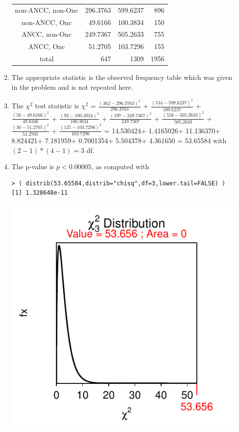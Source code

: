 \documentclass[10pt,openany]{book}\usepackage[]{graphicx}\usepackage[]{color}
\makeatletter
\newenvironment{kframe}{%
 \def\at@end@of@kframe{}%
 \ifinner\ifhmode%
  \def\at@end@of@kframe{\end{minipage}}%
  \begin{minipage}{\columnwidth}%
 \fi\fi%
 \def\FrameCommand##1{\hskip\@totalleftmargin \hskip-\fboxsep
 \colorbox{shadecolor}{##1}\hskip-\fboxsep
     \hskip-\linewidth \hskip-\@totalleftmargin \hskip\columnwidth}%
 \MakeFramed {\advance\hsize-\width
   \@totalleftmargin\z@ \linewidth\hsize
   \@setminipage}}%
 {\par\unskip\endMakeFramed%
 \at@end@of@kframe}
\newenvironment{knitrout}{}{} %
\makeatother
\begin{document}
\begin{itemize}
\begin{enumerate}
\begin{center}
\begin{tabular}{c|rr|r}
            \hline
            non-ANCC, non-Onc & 296.3763 & 599.6237 & 896 \\
            non-ANCC, Onc     &  49.6166 & 100.3834  & 150 \\
            ANCC, non-Onc     & 249.7367 & 505.2633 & 755 \\
            ANCC, Onc         &  51.2705 & 103.7296 & 155 \\
            \hline
            total & 647 & 1309 & 1956 \\
            \hline\hline
          \end{tabular}
        \end{center}
      \item The appropriate statistic is the observed frequency table which was given in the problem and is not repeated here.
      \item The $\chi^{2}$ test statistic is $\chi^{2}$ = $\frac{(362-296.3763)^{2}}{296.3763}$ + $\frac{(534-599.6237)^{2}}{599.6237}$ + $\frac{(58-49.6166)^{2}}{49.6166}$ + $\frac{(92-100.3834)^{2}}{100.3834}$ + $\frac{(197-249.7367)^{2}}{249.7367}$ + $\frac{(558-505.2633)^{2}}{505.2633}$ + $\frac{(30-51.2705)^{2}}{51.2705}$ + $\frac{(125-103.7296)^{2}}{103.7296}$ = 14.530424+ 1.4165026+ 11.136370+ 8.824421+ 7.181959+ 0.7001354+ 5.504378+ 4.361650 = 53.65584 with $(2-1)*(4-1)=3$ df.
      \item The p-value is $p<0.00005$, as computed with
\begin{knitrout}
\color{fgcolor}\begin{kframe}
\begin{verbatim}
> ( distrib(53.65584,distrib="chisq",df=3,lower.tail=FALSE) )
[1] 1.328648e-11
\end{verbatim}
\end{kframe}

{\centering \includegraphics[width=.4\linewidth]{Figs/unnamed-chunk-446-1} 

}




\end{knitrout}
\end{enumerate}
\end{itemize}
\end{document}
